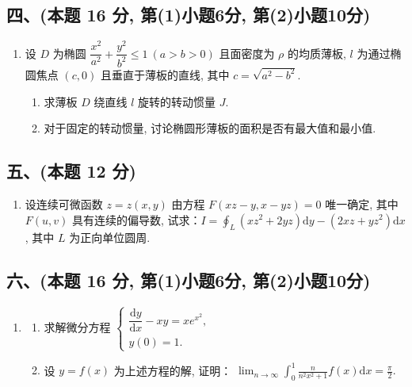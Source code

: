 \subsection*{四、(本题 16 分, 第(1)小题6分, 第(2)小题10分)}
\begin{enumerate}[start=8]
    \item 设 $D$ 为椭圆 $\dfrac{x^2}{a^2} + \dfrac{y^2}{b^2} \leqslant 1 \ (a > b > 0)$ 且面密度为 $\rho$ 的均质薄板, $l$ 为通过椭圆焦点 $(c, 0)$ 且垂直于薄板的直线, 其中 $c = \sqrt{a^2 - b^2}$.
          \begin{enumerate}
              \item[(1)] 求薄板 $D$ 绕直线 $l$ 旋转的转动惯量 $J$.
              \item[(2)] 对于固定的转动惯量, 讨论椭圆形薄板的面积是否有最大值和最小值.
          \end{enumerate}
\end{enumerate}

\subsection*{五、(本题 12 分)}
\begin{enumerate}[start=9]
    \item 设连续可微函数 $z = z(x, y)$ 由方程 $F(xz - y, x - yz) = 0$ 唯一确定, 其中 $F(u, v)$ 具有连续的偏导数, 试求：$I = \displaystyle\oint_L (xz^2 + 2yz) \mathrm{d}y - (2xz + yz^2) \mathrm{d}x$, 其中 $L$ 为正向单位圆周.
\end{enumerate}

\subsection*{六、(本题 16 分, 第(1)小题6分, 第(2)小题10分)}
\begin{enumerate}[start=10]
    \item
          \begin{enumerate}
              \item[(1)] 求解微分方程 $\left\{\begin{array}{l}
                            \dfrac{\mathrm{d}y}{\mathrm{d}x} - xy = x e^{x^2}, \\
                            y(0) = 1.
                        \end{array}\right.$
              \item[(2)] 设 $y = f(x)$ 为上述方程的解, 证明：
                    $\displaystyle\lim_{n\rightarrow\infty}\int_0^1 \frac{n}{n^2 x^2 + 1} f(x) \mathrm{d}x = \frac{\pi}{2}.$
          \end{enumerate}
\end{enumerate}


